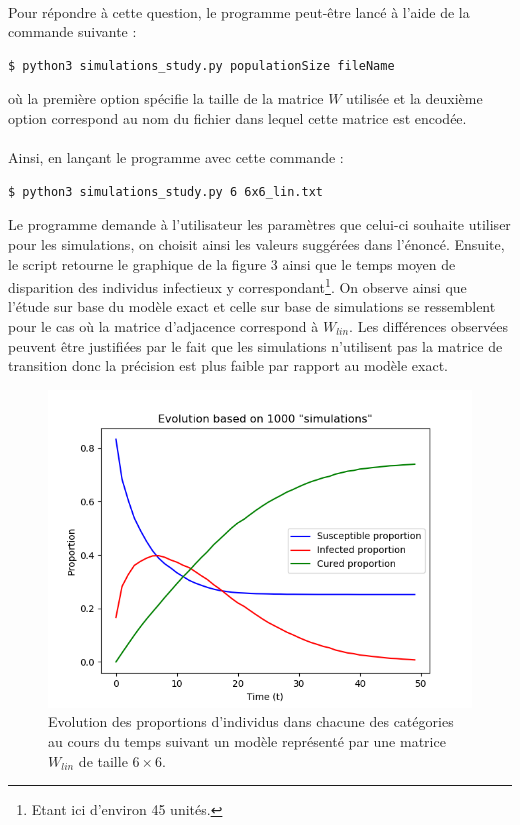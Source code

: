 \documentclass[a4paper, 12pt, oneside]{article}
\begin{document}
\paragraph{}Pour répondre à cette question, le programme peut-être lancé à l'aide de la commande suivante :
\begin{lstlisting}[language=bash]
$ python3 simulations_study.py populationSize fileName 
\end{lstlisting}
\noindent où la première option spécifie la taille de la matrice $W$ utilisée et la deuxième option correspond au nom du fichier dans lequel cette matrice est encodée.

\paragraph{}Ainsi, en lançant le programme avec cette commande :

\begin{lstlisting}[language=bash]
$ python3 simulations_study.py 6 6x6_lin.txt 
\end{lstlisting}

\noindent Le programme demande à l'utilisateur les paramètres que celui-ci souhaite utiliser pour les simulations, on choisit ainsi les valeurs suggérées dans l'énoncé. Ensuite, le script retourne le graphique de la figure 3 ainsi que le temps moyen de disparition des individus infectieux y correspondant\footnote{Etant ici d'environ 45 unités.}. On observe ainsi que l'étude sur base du modèle exact et celle sur base de simulations se ressemblent pour le cas où la matrice d'adjacence correspond à $W_{lin}$. Les différences observées peuvent être justifiées par le fait que les simulations n'utilisent pas la matrice de transition donc la précision est plus faible par rapport au modèle exact.

\begin{figure}[H]
	\centering
	\includegraphics[scale=1]{lin_6x6_simulations.png} 
	\caption{Evolution des proportions d'individus dans chacune des catégories au cours du temps suivant un modèle représenté par une matrice $W_{lin}$ de taille $6 \times 6$.}
\end{figure}
\end{document}

